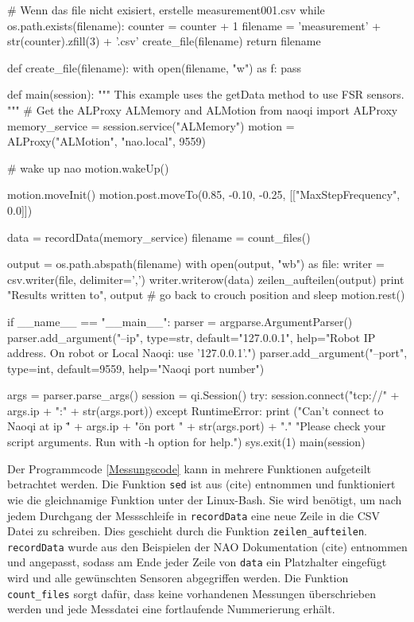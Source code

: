 \begin{python} [caption={Pythonprogramm für Messaufnahmen}, label=Messungscode]
			# Wenn das file nicht exisiert, erstelle measurement001.csv
			while os.path.exists(filename):
				counter = counter + 1
				filename = 'measurement' + str(counter).zfill(3) + '.csv'
			create_file(filename)
			return filename
		
		
		def create_file(filename):
			with open(filename, "w") as f:
				pass
		
		
		def main(session):
			"""
			This example uses the getData method to use FSR sensors.
			"""
			# Get the ALProxy ALMemory and ALMotion
			from naoqi import ALProxy
			memory_service = session.service("ALMemory")
			motion = ALProxy("ALMotion", "nao.local", 9559)
			
			# wake up nao
			motion.wakeUp()
			
			motion.moveInit()
			motion.post.moveTo(0.85, -0.10, -0.25, [["MaxStepFrequency", 0.0]])
			
			data = recordData(memory_service)
			filename = count_files()
			
			output = os.path.abspath(filename)
			with open(output, "wb") as file:
				writer = csv.writer(file, delimiter=',')
				writer.writerow(data)
			zeilen_aufteilen(output)
			print "Results written to", output
			# go back to crouch position and sleep
			motion.rest()
			
		
		if __name__ == "__main__":
			parser = argparse.ArgumentParser()
			parser.add_argument("--ip", type=str, default="127.0.0.1",
			help="Robot IP address. On robot or Local Naoqi: use '127.0.0.1'.")
			parser.add_argument("--port", type=int, default=9559,
			help="Naoqi port number")
			
			args = parser.parse_args()
			session = qi.Session()
			try:
				session.connect("tcp://" + args.ip + ":" + str(args.port))
			except RuntimeError:
				print ("Can't connect to Naoqi at ip \"" + args.ip + "\" on port " + str(args.port) + ".\n"
				"Please check your script arguments. Run with -h option for help.")
			sys.exit(1)
			main(session)	
	\end{python}
Der Programmcode \ref{Messungscode} kann in mehrere Funktionen aufgeteilt betrachtet werden. Die Funktion \texttt{sed} ist aus (cite) entnommen und funktioniert wie die gleichnamige Funktion unter der Linux-Bash. Sie wird benötigt, um nach jedem Durchgang der Messschleife in \texttt{recordData} eine neue Zeile in die CSV Datei zu schreiben. Dies geschieht durch die Funktion \texttt{zeilen\_aufteilen}. \texttt{recordData} wurde aus den Beispielen der NAO Dokumentation (cite) entnommen und angepasst, sodass am Ende jeder Zeile von \texttt{data} ein Platzhalter eingefügt wird und alle gewünschten Sensoren abgegriffen werden. Die Funktion \texttt{count\_files} sorgt dafür, dass keine vorhandenen Messungen überschrieben werden und jede Messdatei eine fortlaufende Nummerierung erhält. 

